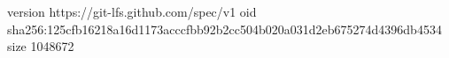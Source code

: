version https://git-lfs.github.com/spec/v1
oid sha256:125cfb16218a16d1173acccfbb92b2cc504b020a031d2eb675274d4396db4534
size 1048672
